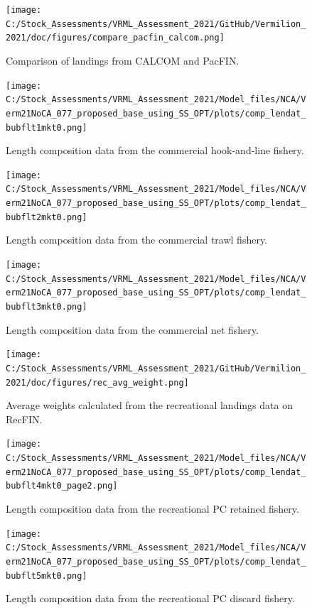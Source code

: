 \documentclass[
  english,
  a4paper,
]{article}
\begin{document}
\begin{figure}
\centering
\texttt{[image: C:/Stock\_Assessments/VRML\_Assessment\_2021/GitHub/Vermilion\_2021/doc/figures/compare\_pacfin\_calcom.png]}
\caption{Comparison of landings from CALCOM and PacFIN.\label{fig:calcom-pacfin}}
\end{figure}

\FloatBarrier

\FloatBarrier

\begin{figure}
\centering
\texttt{[image: C:/Stock\_Assessments/VRML\_Assessment\_2021/Model\_files/NCA/Verm21NoCA\_077\_proposed\_base\_using\_SS\_OPT/plots/comp\_lendat\_bubflt1mkt0.png]}
\caption{Length composition data from the commercial hook-and-line fishery.\label{fig:len-data-COM-HKL}}
\end{figure}

\begin{figure}
\centering
\texttt{[image: C:/Stock\_Assessments/VRML\_Assessment\_2021/Model\_files/NCA/Verm21NoCA\_077\_proposed\_base\_using\_SS\_OPT/plots/comp\_lendat\_bubflt2mkt0.png]}
\caption{Length composition data from the commercial trawl fishery.\label{fig:len-data-COM-TWL}}
\end{figure}

\begin{figure}
\centering
\texttt{[image: C:/Stock\_Assessments/VRML\_Assessment\_2021/Model\_files/NCA/Verm21NoCA\_077\_proposed\_base\_using\_SS\_OPT/plots/comp\_lendat\_bubflt3mkt0.png]}
\caption{Length composition data from the commercial net fishery.\label{fig:len-data-COM-NET}}
\end{figure}

\begin{figure}
\centering
\texttt{[image: C:/Stock\_Assessments/VRML\_Assessment\_2021/GitHub/Vermilion\_2021/doc/figures/rec\_avg\_weight.png]}
\caption{Average weights calculated from the recreational landings data on RecFIN.\label{fig:rec-avg-weights}}
\end{figure}

\begin{figure}
\centering
\texttt{[image: C:/Stock\_Assessments/VRML\_Assessment\_2021/Model\_files/NCA/Verm21NoCA\_077\_proposed\_base\_using\_SS\_OPT/plots/comp\_lendat\_bubflt4mkt0\_page2.png]}
\caption{Length composition data from the recreational PC retained fishery.\label{fig:len-data-REC-PC}}
\end{figure}

\begin{figure}
\centering
\texttt{[image: C:/Stock\_Assessments/VRML\_Assessment\_2021/Model\_files/NCA/Verm21NoCA\_077\_proposed\_base\_using\_SS\_OPT/plots/comp\_lendat\_bubflt5mkt0.png]}
\caption{Length composition data from the recreational PC discard fishery.\label{fig:len-data-REC-PC-DIS}}
\end{figure}
\end{document}
